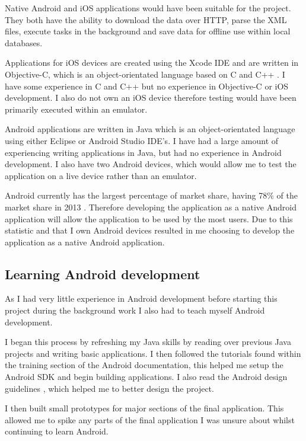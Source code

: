Native Android \cite{android} and iOS applications would have been suitable for the project. They both have the ability to download the data over HTTP, parse the XML \cite{xml} files, execute tasks in the background and save data for offline use within local databases.

Applications for iOS \cite{ios} devices are created using the Xcode IDE and are written in Objective-C, which is an object-orientated language based on C and C++ \cite{obj_c}. I have some experience in C and C++ but no experience in Objective-C or iOS development. I also do not own an iOS device therefore testing would have been primarily executed within an emulator.

Android applications are written in Java which is an object-orientated language using either Eclipse or Android Studio IDE’s. I have had a large amount of experiencing writing applications in Java, but had no experience in Android development. I also have two Android devices, which would allow me to test the application on a live device rather than an emulator.

Android currently has the largest percentage of market share, having 78\% of the market share in 2013 \cite{phone_market}. Therefore developing the application as a native Android application will allow the application to be used by the most users. Due to this statistic and that I own Android devices resulted in me choosing to develop the application as a native Android application.

\subsection{Learning Android development}

As I had very little experience in Android \cite{android} development before starting this project during the background work I also had to teach myself Android development.

I began this process by refreshing my Java \cite{java} skills by reading over previous Java projects and writing basic applications. I then followed the tutorials found within the training section of the Android documentation, this helped me setup the Android SDK \cite{android_sdk} and begin building applications. I also read the Android design guidelines \cite{android_design}, which helped me to better design the project.

I then built small prototypes for major sections of the final application. This allowed me to spike any parts of the final application I was unsure about whilst continuing to learn Android.

